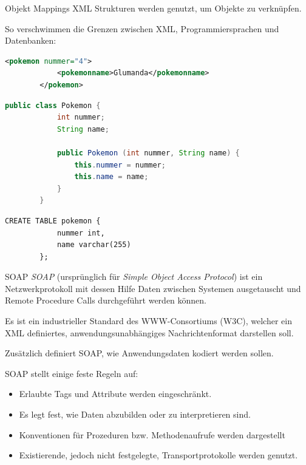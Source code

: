 \begin{bonus}{Objekt Mappings}
    XML Strukturen werden genutzt, um Objekte zu verknüpfen.
    
    So verschwimmen die Grenzen zwischen XML, Programmiersprachen und Datenbanken:
    
    \begin{lstlisting}[language=XML]
        <pokemon nummer="4">
            <pokemonname>Glumanda</pokemonname>
        </pokemon>
    \end{lstlisting}
    
    \begin{lstlisting}[language=java]
        public class Pokemon {
            int nummer;
            String name;

            public Pokemon (int nummer, String name) {
                this.nummer = nummer;
                this.name = name;
            }
        }
    \end{lstlisting}
    
    \begin{lstlisting}[language=mysql]
        CREATE TABLE pokemon {
            nummer int,
            name varchar(255)
        };
    \end{lstlisting}
\end{bonus}

\begin{defi}{SOAP}
    \emph{SOAP} (ursprünglich für \emph{Simple Object Access Protocol}) ist ein Netzwerkprotokoll mit dessen Hilfe Daten zwischen Systemen ausgetauscht und Remote Procedure Calls durchgeführt werden können.
    
    Es ist ein industrieller Standard des WWW-Consortiums (W3C), welcher ein XML definiertes, anwendungsunabhängiges Nachrichtenformat darstellen soll.
    
    Zusätzlich definiert SOAP, wie Anwendungsdaten kodiert werden sollen.
    
    SOAP stellt einige feste Regeln auf:
    \begin{itemize}
        \item Erlaubte Tags und Attribute werden eingeschränkt.
        \item Es legt fest, wie Daten abzubilden oder zu interpretieren sind.
        \item Konventionen für Prozeduren bzw. Methodenaufrufe werden dargestellt
        \item Existierende, jedoch nicht festgelegte, Transportprotokolle werden genutzt.
    \end{itemize}
\end{defi}

